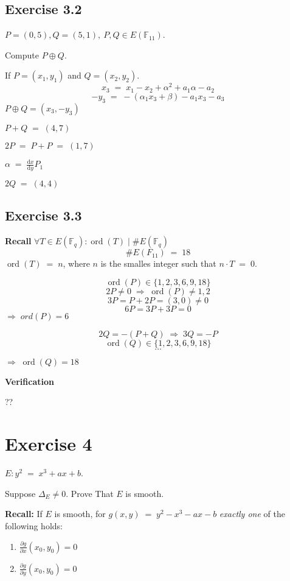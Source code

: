 \documentclass[a4paper]{scrreprt}
\newcommand\F{\mathbb F}
\DeclareMathOperator{\ord}{ord}
\newcommand{\df}{\mathrm{d}}
\begin{document}
\subsection*{Exercise 3.2}
$P=(0,5), Q=(5,1),\ P,Q\in E(\F_{11})$.

Compute $P\oplus Q$.

If $P=(x_1,y_1)$ and $Q=(x_2, y_2)$.
\[x_3 \;=\; x_1-x_2 + \alpha^2 + a_1\alpha-a_2\]
\[-y_3 \;=\; -(\alpha_1x_3+\beta) - a_1x_3-a_3\]
$P\oplus Q = (x_3, -y_3)$

\smallskip

$P+Q \;=\; (4,7)$

$2P \;=\; P+P \;=\; (1,7)$

$\alpha \;=\; \frac{\df x}{\df y}P_1$

$2Q \;=\; (4,4)$

\subsection*{Exercise 3.3}

\textbf{Recall} $\forall T\in E(\F_q) : \ord(T)\mid\#E(\F_q)$
\[\#E(F_{11}) \;=\; 18\]
$\ord(T) \;=\; n$, where $n$ is the smalles integer such that $n\cdot T\;=\;0$.

\[\ord(P)\in\{1, 2, 3, 6, 9, 18\}\]
\[2P \neq 0 \;\Rightarrow\; \ord(P) \neq 1,2\]
\[3P = P + 2P = (3, 0) \neq 0\]
\[6P = 3P + 3P = 0\]
$\Rightarrow\;ord(P)=6$

\[2Q = -(P+Q) \;\Rightarrow\; 3Q = -P\]
\[\ord(Q)\in\{1, 2, 3, 6, 9, 18\}\]
\[\hdots\]

$\Rightarrow\;\ord(Q) = 18$

\textbf{Verification}

??

\section*{Exercise 4}

$E: y^2 \;=\; x^3+ax+b$.

\smallskip

 Suppose $\Delta_E \neq0$. Prove That $E$ is smooth.

\textbf{Recall:} If $E$ is smooth, for $g(x,y)\;=\;y^2 -x^3 - ax - b$
\textit{exactly one} of the following holds:\begin{enumerate}[label=(\roman*)]
    \item $\frac{\partial g}{\partial x}(x_0, y_0) = 0$
    \item $\frac{\partial g}{\partial y}(x_0, y_0) = 0$
\end{enumerate}
\end{document}
